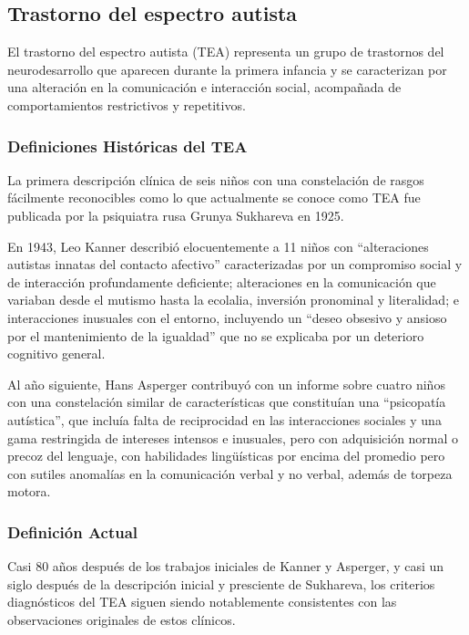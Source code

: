 \documentclass[11pt,letterpaper]{report}
\begin{document}
\subsection{Trastorno del espectro autista}
El trastorno del espectro autista (TEA) representa un grupo de trastornos del
neurodesarrollo que aparecen durante la primera infancia y se caracterizan por
una alteración en la comunicación e interacción social, acompañada de
comportamientos restrictivos y repetitivos.

\subsubsection{Definiciones Históricas del TEA}
La primera descripción clínica de seis niños con una constelación de rasgos
fácilmente reconocibles como lo que actualmente se conoce como TEA fue
publicada por la psiquiatra rusa Grunya Sukhareva en 1925. \cite{Myers2025}

En 1943, Leo Kanner describió elocuentemente a 11 niños con ``alteraciones
autistas innatas del contacto afectivo'' caracterizadas por un compromiso
social y de interacción profundamente deficiente; alteraciones en la
comunicación que variaban desde el mutismo hasta la ecolalia, inversión
pronominal y literalidad; e interacciones inusuales con el entorno, incluyendo
un ``deseo obsesivo y ansioso por el mantenimiento de la igualdad'' que no se
explicaba por un deterioro cognitivo general. \cite{Myers2025}

Al año siguiente, Hans Asperger contribuyó con un informe sobre cuatro niños
con una constelación similar de características que constituían una
``psicopatía autística'', que incluía falta de reciprocidad en las
interacciones sociales y una gama restringida de intereses intensos e
inusuales, pero con adquisición normal o precoz del lenguaje, con habilidades
lingüísticas por encima del promedio pero con sutiles anomalías en la
comunicación verbal y no verbal, además de torpeza motora. \cite{Myers2025}

\subsubsection{Definición Actual}
Casi 80 años después de los trabajos iniciales de Kanner y Asperger, y casi un
siglo después de la descripción inicial y presciente de Sukhareva, los
criterios diagnósticos del TEA siguen siendo notablemente consistentes con las
observaciones originales de estos clínicos. \cite{Myers2025}
\end{document}
